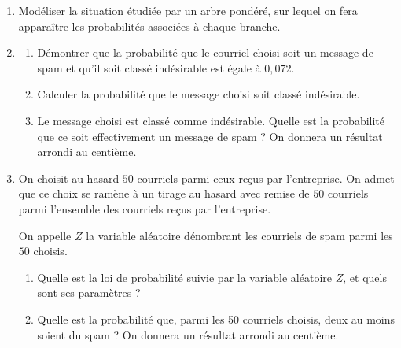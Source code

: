 \documentclass[10pt]{article}
\begin{document}
\begin{enumerate}
\item Modéliser la situation étudiée par un arbre pondéré, sur lequel on fera apparaître les probabilités associées à chaque branche.
\item 
	\begin{enumerate}
		\item Démontrer que la probabilité que le courriel choisi soit un message de spam et qu'il soit classé indésirable est égale à $0,072$.
		\item Calculer la probabilité que le message choisi soit classé indésirable.
		\item Le message choisi est classé comme indésirable. Quelle est la probabilité que ce soit effectivement un message de spam ? On donnera un résultat arrondi au centième.
	\end{enumerate}
\item On choisit au hasard $50$ courriels parmi ceux reçus par l'entreprise. On admet que ce choix se ramène à un tirage au hasard avec remise de $50$ courriels parmi l'ensemble des courriels reçus par l'entreprise.

On appelle $Z$ la variable aléatoire dénombrant les courriels de spam parmi les $50$ choisis.
	\begin{enumerate}
		\item Quelle est la loi de probabilité suivie par la variable aléatoire $Z$, et quels sont ses paramètres ?
		\item Quelle est la probabilité que, parmi les 50 courriels choisis, deux au moins soient du spam ? On donnera un résultat arrondi au centième.
	\end{enumerate}
\end{enumerate}

\bigskip
\end{document}
